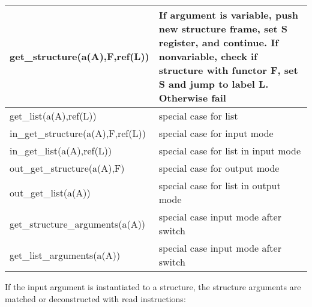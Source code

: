 \begin{tabular}{|p{}|p{}|}
\hline
get_structure(a(A),F,ref(L))    & If argument is variable, push new structure
        frame, set S register, and continue. If nonvariable, check if
        structure with functor F, set S and jump to label L. Otherwise fail \\
\hline
get_list(a(A),ref(L))           & special case for list   \\
in_get_structure(a(A),F,ref(L))         &        special case for input mode      \\
in_get_list(a(A),ref(L))        & special case for list in input mode             \\
out_get_structure(a(A),F)       & special case for output mode                    \\
out_get_list(a(A))              &  special case for list in output mode           \\
get_structure_arguments(a(A))   & special case input mode after switch            \\
get_list_arguments(a(A))        & special case input mode after switch            \\
\hline
\end{tabular}

If the input argument is instantiated to a structure, the structure
arguments are matched or deconstructed with read instructions:

